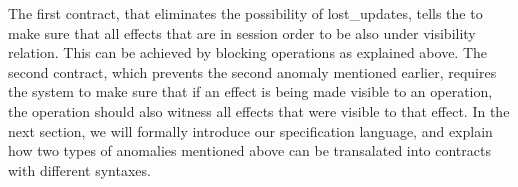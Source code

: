 The first contract, that eliminates the possibility of lost\_updates,
tells the \tool to make sure that all effects that are in session order
to be also under visibility relation. This can be achieved by blocking
operations as explained above. 
The second contract, which prevents the second anomaly mentioned earlier,
requires the system to make sure that if an effect is being made visible
to an operation, the operation should also witness all effects that were
visible to that effect.
In the next section, we will formally introduce our specification
language, and explain how two types of anomalies mentioned above can be
transalated into contracts with different syntaxes.





















